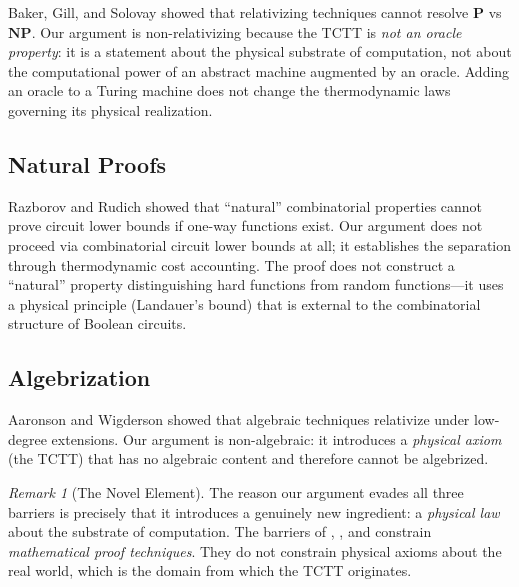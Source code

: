 \documentclass[12pt, a4paper]{article}
\newcommand{\Pc}{\mathbf{P}}
\newcommand{\NPc}{\mathbf{NP}}
\theoremstyle{plain}
\theoremstyle{definition}
\theoremstyle{remark}
\newtheorem{remark}[theorem]{Remark}
\begin{document}
Baker, Gill, and Solovay \citep{BakerGillSolovay1975} showed that
relativizing techniques cannot resolve $\Pc$ vs $\NPc$. Our argument is
non-relativizing because the TCTT is \emph{not an oracle property}: it
is a statement about the physical substrate of computation, not about
the computational power of an abstract machine augmented by an oracle.
Adding an oracle to a Turing machine does not change the thermodynamic
laws governing its physical realization.

\subsection{Natural Proofs}

Razborov and Rudich \citep{RazborovRudich1997} showed that ``natural''
combinatorial properties cannot prove circuit lower bounds if one-way
functions exist. Our argument does not proceed via combinatorial circuit
lower bounds at all; it establishes the separation through thermodynamic
cost accounting. The proof does not construct a ``natural'' property
distinguishing hard functions from random functions---it uses a physical
principle (Landauer's bound) that is external to the combinatorial structure
of Boolean circuits.

\subsection{Algebrization}

Aaronson and Wigderson \citep{AaronsonWigderson2009} showed that
algebraic techniques relativize under low-degree extensions. Our
argument is non-algebraic: it introduces a \emph{physical axiom}
(the TCTT) that has no algebraic content and therefore cannot be
algebrized.

\begin{remark}[The Novel Element]
  The reason our argument evades all three barriers is precisely
  that it introduces a genuinely new ingredient: a \emph{physical law}
  about the substrate of computation. The barriers of
  \citet{BakerGillSolovay1975}, \citet{RazborovRudich1997}, and
  \citet{AaronsonWigderson2009} constrain \emph{mathematical proof
  techniques}. They do not constrain physical axioms about the
  real world, which is the domain from which the TCTT originates.
\end{remark}

\end{document}
